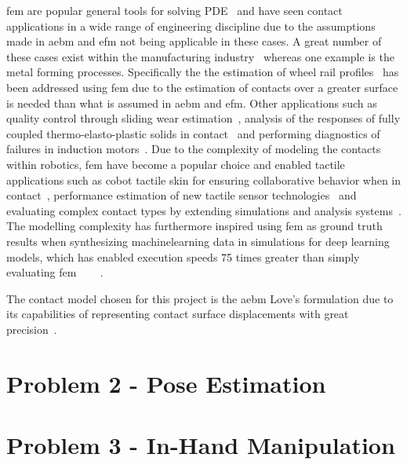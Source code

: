 \gls{fem} are popular general tools for solving PDE~\cite{history-of-finite-element-method:-a-review} and have seen contact applications in a wide range of engineering discipline due to the assumptions made in \gls{aebm} and \gls{efm} not being applicable in these cases. A great number of these cases exist within the manufacturing industry~\cite{examples-of-fem-application-in-manufacturing-technology} whereas one example is the metal forming processes. Specifically the the estimation of wheel rail profiles~\cite{contact-mechanics-analysis-of-measured-wheel-rail-profiles-using-the-finite-element-method} has been addressed using \gls{fem} due to the estimation of contacts over a greater surface is needed than what is assumed in \gls{aebm} and \gls{efm}. Other applications such as quality control through sliding wear estimation~\cite{simulating-sliding-wear-with-finite-element-method}, analysis of the responses of fully coupled thermo-elasto-plastic solids in contact~\cite{a-finite-element-procedure-for-the-analysis-of-thermo-mechanical-solids-in-contact} and performing diagnostics of failures in induction motors~\cite{induction-motors-fault-diagnosis-using-finite-element-method:-a-review}. Due to the complexity of modeling the contacts within robotics, \gls{fem} have become a popular choice and enabled tactile applications such as \gls{cobot} tactile skin for ensuring collaborative behavior when in contact~\cite{soft-robot-skin-with-conformal-adaptability-for-on-body-tactile-perception-of-collaborative-robots}, performance estimation of new tactile sensor technologies~\cite{design-and-experimental-research-of-robot-finger-sliding-tactile-sensor-based-on-fbg} and evaluating complex contact types by extending simulations and analysis systems~\cite{grasp-analysis-using-deformable-fingers}.
The modelling complexity has furthermore inspired using \gls{fem} as ground truth results when synthesizing machinelearning data in simulations for deep learning models, which has enabled execution speeds 75 times greater than simply evaluating \gls{fem}~\cite{sim-to-real-for-robotic-tactile-sensing-via-physics-based-simulation-and-learned-latent-projections} 
~\cite{interpreting-and-predicting-tactile-signals-via-a-physics-based-and-data-driven-framework}
~\cite{ground-truth-force-distribution-for-learning-based-tactile-sensing:-a-finite-element-approach}. \medskip

The contact model chosen for this project is the \gls{aebm} Love's formulation due to its capabilities of representing contact surface displacements with great precision~\cite{contact-modelling-and-tactile-data-processing-for-robot-skins}.

\section{Problem 2 - Pose Estimation}\label{sec:lit-rev-problem-2}

\section{Problem 3 - In-Hand Manipulation}\label{sec:lit-rev-problem-3}